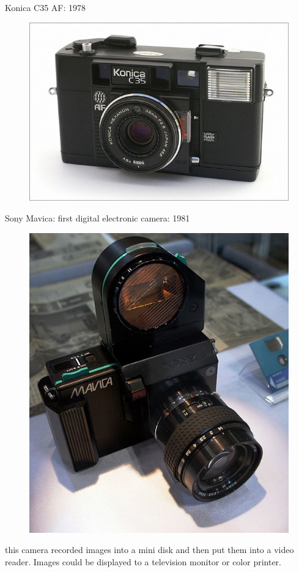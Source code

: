 \documentclass{beamer}
\begin{document}
	\begin{frame}{Konica C35 AF: 1978}
		\begin{figure}
			\centering
			\includegraphics[scale=0.4]{131.jpg}
		\end{figure}
	\end{frame}
	
	\begin{frame}{Sony Mavica: first digital electronic camera: 1981}
		\begin{figure}
			\centering
			\includegraphics[scale=0.3]{132.jpg}
		\end{figure}
		this camera recorded images into a mini disk and then put them into a video reader. Images could be displayed to a television monitor or color printer.
	\end{frame}
\end{document}
